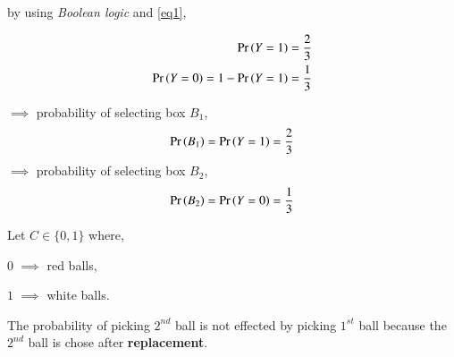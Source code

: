 \documentclass[journal,12pt,twocolumn]{IEEEtran}
\begin{document}
by using \textit{Boolean logic} and \eqref{eq1},

\begin{align}
    \Pr\left(Y=1\right)=\frac{2}{3}\\
    \Pr\left(Y=0\right)=1-\Pr\left(Y=1\right)=\frac{1}{3}
\end{align}

$\implies$ probability of selecting box $B_1$,
\begin{align}\label{eq2}
    \Pr\left(B_1\right)=\Pr\left(Y=1\right)=\frac{2}{3}
\end{align}
$\implies$ probability of selecting box $B_2$,
\begin{align}\label{eq3}
    \Pr\left(B_2\right)=\Pr\left(Y=0\right)=\frac{1}{3}
\end{align}

Let $C \in \{0,1\}$ where, 

$0$ $\implies$ red balls,

$1$ $\implies$ white balls.

\begin{table}[h!]
\centering
\caption{Table of number of balls}
\label{table1}
\end{table}

\begin{table}[h!]
\centering
\caption{Table of probability of taking balls from each box}
\label{Table2}
\end{table}

The probability of picking $2^{nd}$ ball is not effected by picking $1^{st}$ ball because the $2^{nd}$ ball is chose after \textbf{replacement}.
\end{document}
